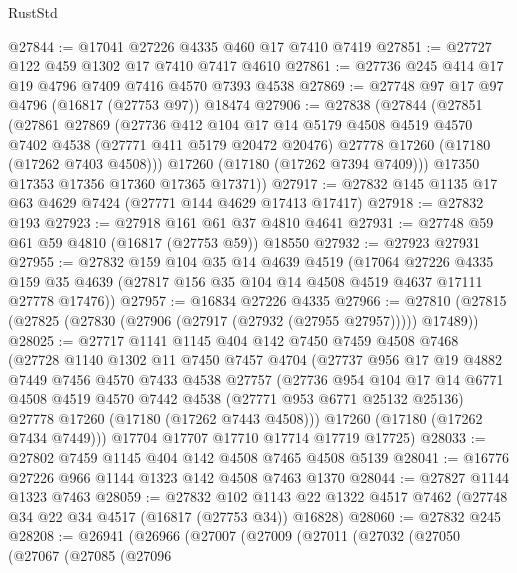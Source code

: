 \begin{lexlean}{RustStd}
\begin{coremodule}
{\begin{coremodule}
{{{{{{{{{{{{{{{{{{{{{{{{{{{{{{{{{{{{{{{{{{{{{{{{{{{{{{{@27844 := @17041 @27226 @4335 @460 @17 @7410 @7419
@27851 := @27727 @122 @459 @1302 @17 @7410 @7417 @4610
@27861 := @27736 @245 @414 @17 @19 @4796 @7409 @7416 @4570 @7393 @4538
@27869 := @27748 @97 @17 @97 @4796 (@16817 (@27753 @97)) @18474
@27906 := @27838
    (@27844
      (@27851
        (@27861
          @27869
          (@27736
            @412
            @104
            @17
            @14
            @5179
            @4508
            @4519
            @4570
            @7402
            @4538
            (@27771 @411 @5179 @20472 @20476)
            @27778
            @17260
            (@17180 (@17262 @7403 @4508)))
          @17260
          (@17180 (@17262 @7394 @7409)))
        @17350
        @17353
        @17356
        @17360
        @17365
        @17371))
@27917 := @27832 @145 @1135 @17 @63 @4629 @7424 (@27771 @144 @4629 @17413 @17417)
@27918 := @27832 @193
@27923 := @27918 @161 @61 @37 @4810 @4641
@27931 := @27748 @59 @61 @59 @4810 (@16817 (@27753 @59)) @18550
@27932 := @27923 @27931
@27955 := @27832
    @159
    @104
    @35
    @14
    @4639
    @4519
    (@17064
      @27226
      @4335
      @159
      @35
      @4639
      (@27817 @156 @35 @104 @14 @4508 @4519 @4637 @17111 @27778 @17476))
@27957 := @16834 @27226 @4335
@27966 := @27810 (@27815 (@27825 (@27830 (@27906 (@27917 (@27932 (@27955 @27957))))) @17489))
@28025 := @27717
    @1141
    @1145
    @404
    @142
    @7450
    @7459
    @4508
    @7468
    (@27728
      @1140
      @1302
      @11
      @7450
      @7457
      @4704
      (@27737
        @956
        @17
        @19
        @4882
        @7449
        @7456
        @4570
        @7433
        @4538
        @27757
        (@27736
          @954
          @104
          @17
          @14
          @6771
          @4508
          @4519
          @4570
          @7442
          @4538
          (@27771 @953 @6771 @25132 @25136)
          @27778
          @17260
          (@17180 (@17262 @7443 @4508)))
        @17260
        (@17180 (@17262 @7434 @7449)))
      @17704
      @17707
      @17710
      @17714
      @17719
      @17725)
@28033 := @27802 @7459 @1145 @404 @142 @4508 @7465 @4508 @5139
@28041 := @16776 @27226 @966 @1144 @1323 @142 @4508 @7463 @1370
@28044 := @27827 @1144 @1323 @7463
@28059 := @27832
    @102
    @1143
    @22
    @1322
    @4517
    @7462
    (@27748 @34 @22 @34 @4517 (@16817 (@27753 @34)) @16828)
@28060 := @27832 @245
@28208 := @26941
    (@26966
      (@27007
        (@27009
          (@27011
            (@27032
              (@27050
                (@27067
                  (@27085
                    (@27096
}}}}}}}}}}}}}}}}}}}}}}}}}}}}}}}}}}}}}}}}}}}}}}}}}}}}}}}
\end{coremodule}}
\end{coremodule}
\end{lexlean}
